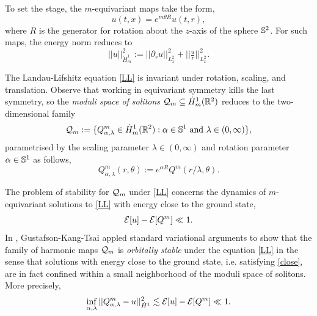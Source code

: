 To set the stage, the  $m$-equivariant maps take the form, 
	\[
		u (t, x) = e^{m \theta R} u(t, r),
	\]
where $R$ is the generator for rotation about the $z$-axis of the sphere $\mathbb S^2$. For such maps, the energy norm reduces to 
	\[
		||u||_{\dot H^1_m}^2
			:= ||\partial_r u||_{L^2_x}^2 + || \tfrac{u}{r} ||_{L^2_x}^2. 
	\]

The Landau-Lifshitz equation \eqref{LL} is invariant under rotation, scaling, and translation. Observe that working in equivariant symmetry kills the last symmetry, so the \textit{moduli space of solitons} $\mathcal Q_m \subseteq \dot H^1_m (\mathbb R^2)$ reduces to the two-dimensional family 
	\[
		\mathcal Q_m
			:= \{ Q^m_{\alpha, \lambda} \in \dot H^1_{m} (\mathbb R^2): \alpha \in \mathbb S^1 \text{ and } \lambda \in (0, \infty) \},
	\]
parametrised by the scaling parameter $\lambda \in (0, \infty)$ and rotation parameter $\alpha \in \mathbb S^1$ as follows,
	\[
		Q^m_{\alpha, \lambda} (r, \theta) 
				:= e^{\alpha R} Q^m(r/\lambda, \theta). 
	\]

The problem of stability for $\mathcal Q_m$ under \eqref{LL} concerns the dynamics of $m$-equivariant solutions to \eqref{LL} with energy close to the ground state, 
	\begin{equation}\label{eq:close}
		\mathcal E[u] - \mathcal E[Q^m] \ll 1. 
	\end{equation}
In \cite{gustafson2007schrodinger}, Gustafson-Kang-Tsai appled standard variational arguments to show that the family of harmonic maps $\mathcal Q_m$ is \textit{orbitally stable} under the equation \eqref{LL} in the sense that solutions with energy close to the ground state, i.e. satisfying \eqref{close}, are in fact confined within a small neighborhood of the moduli space of solitons. More precisely,
	\begin{equation}\label{eq:orbital}
		\inf_{\alpha ,\lambda} || Q^m_{\alpha, \lambda} - u||_{\dot H^1}^2 \lesssim \mathcal E[u] - \mathcal E[Q^m] \ll 1. 
	\end{equation}


